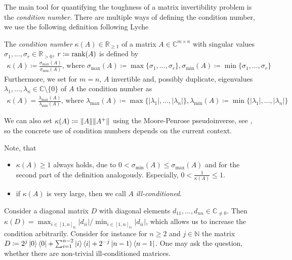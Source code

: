 The main tool for quantifying the toughness of a matrix invertibility problem is the \emph{condition number}. There are multiple ways of defining the condition number, we use the following definition following Lyche \cite{Lyche}

\begin{definition} \label{condition_number}
    The \emph{condition number} \(\kappa(A) \in \mathbb{R}_{\geq 1}\) of a matrix \(A \in \mathbb{C}^{m \times n}\) with singular values \(\sigma_1, ..., \sigma_r \in \mathbb{R}_{> 0}\), \(r \coloneqq \rank(A)\) is defined by
    \begin{align}
        \kappa(A) \coloneqq \frac{\sigma_{\max}(A)}{\sigma_{\min}(A)} \text{, where } \sigma_{\max}(A) \coloneqq \max\{\sigma_1, ..., \sigma_r\}, \sigma_{\min}(A) \coloneqq \min\{\sigma_1, ..., \sigma_r\}
    \end{align}
    Furthermore, we set for \(m = n\), \(A\) invertible and, possibly duplicate, eigenvalues \(\lambda_1, ..., \lambda_n \in \mathbb{C} \setminus \{0\}\) of \(A\) the condition number as
    \begin{align}
        \kappa(A) = \frac{\lambda_{\max}(A)}{\lambda_{\min}(A)} \text{, where } \lambda_{\max}(A) \coloneqq \max\{|\lambda_1|, ..., |\lambda_n|\}, \lambda_{\min}(A) \coloneqq \min\{|\lambda_1|, ..., |\lambda_n|\}
    \end{align}
\end{definition}

We can also set \(\kappa(A) \coloneqq \norm{A}\norm{A^+}\) using the Moore-Penrose pseudoinverse, see , so the concrete use of condition numbers depends on the current context. 

\begin{remark}
    Note, that
    \begin{itemize}
        \item \(\kappa(A) \geq 1\) always holds, due to \(0 < \sigma_{\min}(A) \leq \sigma_{\max}(A)\) and for the second part of the definition analogously. Especially, \(0 < \frac{1}{\kappa(A)} \leq 1\).
        \item if \(\kappa(A)\) is very large, then we call \(A\) \emph{ill-conditioned}.
    \end{itemize}
\end{remark}

\begin{example} \label{diagonal_matrix_condition_number_example}
    Consider a diagonal matrix \(D\) with diagonal elements \(d_{11}, ..., d_{nn} \in \mathbb{C}_{\neq 0}\). Then \(\kappa(D) = \max_{i \in [1, n]_{\mathbb{N}}}|d_{ii}| / \min_{i \in [1, n]_{\mathbb{N}}}|d_{ii}|\), which allows us to increase the condition arbitrarily. Consider for instance for \(n \geq 2\) and \(j \in \mathbb{N}\) the matrix \(D \coloneqq 2^j \ket{0}\bra{0} + \sum_{i = 1}^{n-2} \ket{i}\bra{i} + 2^{-j} \ket{n-1}\bra{n-1}\). One may ask the question, whether there are non-trivial ill-conditioned matrices.
\end{example}

